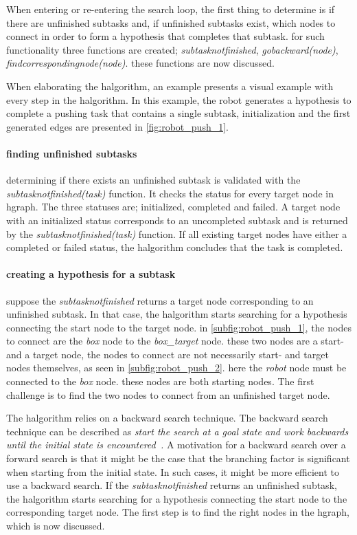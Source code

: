 When entering or re-entering the search loop, the first thing to determine is if there are unfinished subtasks and, if unfinished subtasks exist, which nodes to connect in order to form a hypothesis that completes that subtask. for such functionality three functions are created; \textit{subtasknotfinished}, \textit{gobackward(\gls{node})}, \textit{findcorrespondingnode(\gls{node})}. these functions are now discussed.\bs

When elaborating the \ac{halgorithm}, an example presents a visual example with every step in the \ac{halgorithm}. In this example, the robot generates a hypothesis to complete a pushing task that contains a single subtask, initialization and the first generated edges are presented in \cref{fig:robot_push_1}.\bs

\paragraph{finding unfinished subtasks}
determining if there exists an unfinished subtask is validated with the \textit{subtasknotfinished(\gls{task})} function. It checks the status for every target node in \ac{hgraph}. The three statuses are; initialized, completed and failed. A target node with an initialized status corresponds to an uncompleted subtask and is returned by the \textit{subtasknotfinished(\gls{task})} function. If all existing target nodes have either a completed or failed status, the \ac{halgorithm} concludes that the task is completed.\bs

\paragraph{creating a hypothesis for a subtask}
suppose the \textit{subtasknotfinished} returns a target node corresponding to an unfinished subtask. In that case, the \ac{halgorithm} starts searching for a hypothesis connecting the start node to the target node. in \cref{subfig:robot_push_1}, the nodes to connect are the \textit{box} node to the \textit{box\_target} node. these two nodes are a start- and a target node, the nodes to connect are not necessarily start- and target nodes themselves, as seen in \cref{subfig:robot_push_2}. here the \textit{robot} node must be connected to the \textit{box} node. these nodes are both starting nodes. The first challenge is to find the two nodes to connect from an unfinished target node.\bs

 The \ac{halgorithm} relies on a backward search technique. The backward search technique can be described as \textit{start the search at a goal state and work backwards until the initial state is encountered~\cite{lavalle_planning_2006}.} A motivation for a backward search over a forward search is that it might be the case that the branching factor is significant when starting from the initial state. In such cases, it might be more efficient to use a backward search. If the \textit{subtasknotfinished} returns an unfinished subtask, the \ac{halgorithm} starts searching for a hypothesis connecting the start node to the corresponding target node. The first step is to find the right nodes in the \ac{hgraph}, which is now discussed.\bs

